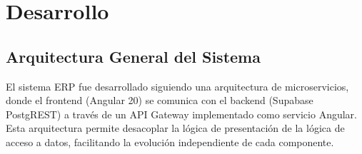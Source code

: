 \documentclass[12pt,a4paper]{article}
\begin{document}
\section{Desarrollo}

\subsection{Arquitectura General del Sistema}

El sistema ERP fue desarrollado siguiendo una arquitectura de microservicios, donde el frontend (Angular 20) se comunica con el backend (Supabase PostgREST) a través de un API Gateway implementado como servicio Angular. Esta arquitectura permite desacoplar la lógica de presentación de la lógica de acceso a datos, facilitando la evolución independiente de cada componente.
\end{document}
